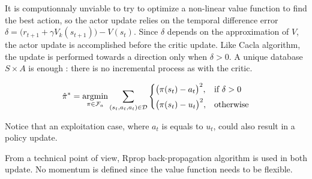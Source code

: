 It is computionnaly unviable to try to optimize a non-linear value function to find
the best action, so the actor update
relies on the temporal difference error $\delta = \big( r_{t+1} + \gamma V_k(s_{t+1}) \big) - V(s_t)$.
Since $\delta$ depends on the approximation of $V$, the actor update is accomplished before the critic update.
Like Cacla algorithm, the update is performed towards a direction only when $\delta > 0$.
A unique database $ S \times A$ is enough : there is no incremental process as with the critic.

\begin{equation}
 \hat{\pi}^* = \underset{\pi \in \mathcal{F}_a}{\text{argmin}} 
 \sum_{ (s_t,a_t, a_t) \in \mathcal{D}}
 \begin{dcases}
  \big( \pi(s_t) - a_t \big)^2 ,& \text{if } \delta > 0\\
  \big( \pi(s_t) - u_t \big)^2 ,& \text{otherwise}
 \end{dcases}
\end{equation}

Notice that an exploitation case, where $a_t$ is equals to $u_t$, could also
result in a policy update.

From a technical point of view, Rprop back-propagation algorithm is used in both update.
No momentum is defined since the value function needs to be flexible.
